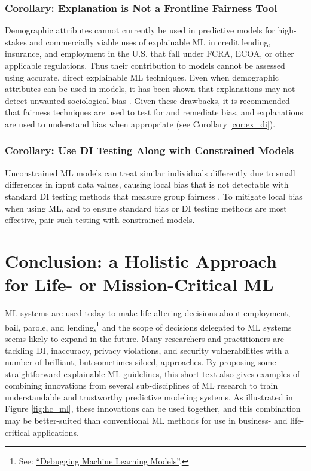 \documentclass{article}
\begin{document}
\subsubsection{Corollary: Explanation is Not a Frontline Fairness Tool} Demographic attributes cannot currently be used in predictive models for high-stakes and commercially viable uses of explainable ML in credit lending, insurance, and employment in the U.S. that fall under FCRA, ECOA, or other applicable regulations. Thus their contribution to models cannot be assessed using accurate, direct explainable ML techniques. Even when demographic attributes can be used in models, it has been shown that explanations may not detect unwanted sociological bias \cite{fair_washing}. Given these drawbacks, it is recommended that fairness techniques are used to test for and remediate bias, and explanations are used to understand bias when appropriate (see Corollary \ref{cor:ex_di}).

\subsubsection{Corollary: Use DI Testing Along with Constrained Models} \label{cor:di_con}

Unconstrained ML models can treat similar individuals differently due to small differences in input data values, causing local bias that is not detectable with standard DI testing methods that measure group fairness \cite{dwork2012fairness}. To mitigate local bias when using ML, and to ensure standard bias or DI testing methods are most effective, pair such testing with constrained models.

\section{Conclusion: a Holistic Approach for Life- or Mission-Critical ML} \label{sec:conclusion}

ML systems are used today to make life-altering decisions about employment, bail, parole, and lending,\footnote{\scriptsize{See: \href{https://debug-ml-iclr2019.github.io/}{``Debugging Machine Learning Models''}.}} and the scope of decisions delegated to ML systems seems likely to expand in the future. Many researchers and practitioners are tackling DI, inaccuracy, privacy violations, and security vulnerabilities with a number of brilliant, but sometimes siloed, approaches. By proposing some straightforward explainable ML guidelines, this short text also gives examples of combining innovations from several sub-disciplines of ML research to train understandable and trustworthy predictive modeling systems. As illustrated in Figure \ref{fig:hc_ml}, these innovations can be used together, and this combination may be better-suited than conventional ML methods for use in business- and life-critical applications.
\end{document}
